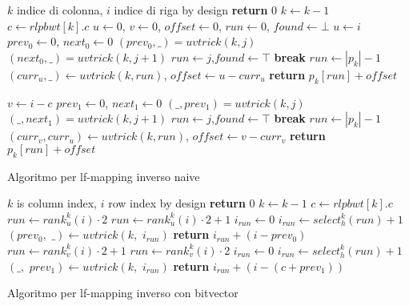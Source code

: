 \begin{algorithm}
  \begin{algorithmic}[1]
    \Comment $k$ indice di colonna, $i$ indice di riga
    \Comment by design
    \State \textbf{return} $0$
    \EndIf
    \State $k\gets k-1$
    \State $c\gets rlpbwt[k].c$
    \State $u\gets 0$, $v\gets 0$, $offset\gets 0$, $run \gets 0$,
    $found\gets \bot$
    \State $u\gets i$
    \State $prev_0\gets 0$, $next_0\gets 0$
    \For {\textit{every} $j\in [0,|p_k|)$}
    \State $(prev_0,\_) = uvtrick(k,j)$
    \State $(next_0,\_) = uvtrick(k,j+1)$
    \State $run\gets j$,$found\gets \top$
    \State \textbf{break}
    \EndIf
    \EndFor
    \State $run \gets |p_k|-1$
    \EndIf
    \State $(curr_u,\_)\gets uvtrick(k, run)$, $offset\gets u-curr_u$
    \State \textbf{return} $p_k[run]+offset$
    \Else

    \State $v\gets i-c$
    \State $prev_1\gets 0$, $next_1\gets 0$
    \For {\textit{every} $j\in [0,|p_k|)$}
    \State $(\_,prev_1) = uvtrick(k,j)$
    \State $(\_,next_1) = uvtrick(k,j+1)$
    \State $run\gets j$,$found\gets \top$
    \State \textbf{break}
    \EndIf
    \EndFor
    \State $run \gets |p_k|-1$
    \EndIf
    \State $(curr_v,curr_u)\gets uvtrick(k, run)$, $offset\gets v-curr_v$
    \State \textbf{return} $p_k[run]+offset$
    \EndIf
    \EndFunction
  \end{algorithmic}
  \caption{Algoritmo per lf-mapping inverso naive}
  \label{algo:lfrev}
\end{algorithm}

\begin{algorithm}
  \begin{algorithmic}[1]
    \Comment $k$ is column index, $i$ row index
    \Comment by design
    \State \textbf{return} $0$
    \EndIf
    \State $k\gets k-1$
    \State $c\gets rlpbwt[k].c$
    \State $run\gets rank_u^{k}(i)\cdot 2$
    \Else
    \State $run\gets rank_u^{k}(i)\cdot 2+1$
    \EndIf
    \State $i_{run}\gets 0$
    \State $i_{run}\gets select_h^{k}(run)+1$
    \EndIf
    \State $(prev_0,\,\,\_)\gets uvtrick(k,\,\,i_{run})$
    \State \textbf{return} $i_{run}+(i-prev_0)$
    \Else
    \State $run\gets rank_v^{k}(i)\cdot 2+1$
    \Else
    \State $run\gets rank_v^{k}(i)\cdot 2$
    \EndIf
    \State $i_{run}\gets 0$
    \State $i_{run}\gets select_h^{k}(run)+1$
    \EndIf
    \State $(\_,\,\,prev_1)\gets uvtrick(k,\,\,i_{run})$
    \State \textbf{return} $i_{run}+(i-(c+prev_1))$
    \EndIf
    \EndFunction
  \end{algorithmic}
  \caption{Algoritmo per lf-mapping inverso con bitvector}
  \label{algo:lfrevbv}
\end{algorithm}

